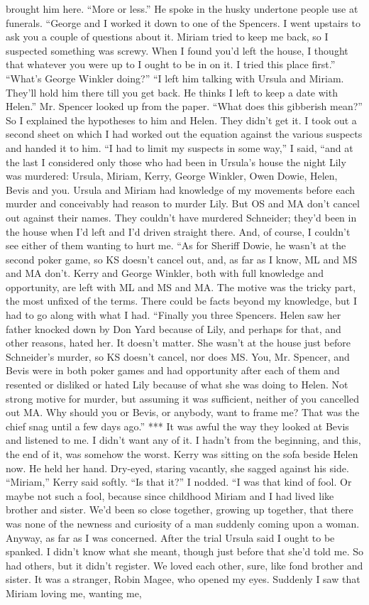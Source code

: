 \documentclass{novel}
\begin{document}
brought him here. “More or less.” He spoke in the husky undertone people use at funerals. “George and I worked it down to one of the Spencers. I went upstairs to ask you a couple of questions about it. Miriam tried to keep me back, so I suspected something was screwy. When I found you’d left the house, I thought that whatever you were up to I ought to be in on it. I tried this place first.” “What’s George Winkler doing?” “I left him talking with Ursula and Miriam. They’ll hold him there till you get back. He thinks I left to keep a date with Helen.” Mr. Spencer looked up from the paper. “What does this gibberish mean?” So I explained the hypotheses to him and Helen. They didn’t get it. I took out a second sheet on which I had worked out the equation against the various suspects and handed it to him. “I had to limit my suspects in some way,” I said, “and at the last I considered only those who had been in Ursula’s house the night Lily was murdered: Ursula, Miriam, Kerry, George Winkler, Owen Dowie, Helen, Bevis and you. Ursula and Miriam had knowledge of my movements before each murder and conceivably had reason to murder Lily. But OS and MA don’t cancel out against their names. They couldn’t have murdered Schneider; they’d been in the house when I’d left and I’d driven straight there. And, of course, I couldn’t see either of them wanting to hurt me. “As for Sheriff Dowie, he wasn’t at the second poker game, so KS doesn’t cancel out, and, as far as I know, ML and MS and MA don’t. Kerry and George Winkler, both with full knowledge and opportunity, are left with ML and MS and MA. The motive was the tricky part, the most unfixed of the terms. There could be facts beyond my knowledge, but I had to go along with what I had. “Finally you three Spencers. Helen saw her father knocked down by Don Yard because of Lily, and perhaps for that, and other reasons, hated her. It doesn’t matter. She wasn’t at the house just before Schneider’s murder, so KS doesn’t cancel, nor does MS. You, Mr. Spencer, and Bevis were in both poker games and had opportunity after each of them and resented or disliked or hated Lily because of what she was doing to Helen. Not strong motive for murder, but assuming it was sufficient, neither of you cancelled out MA. Why should you or Bevis, or anybody, want to frame me? That was the chief snag until a few days ago.” *** It was awful the way they looked at Bevis and listened to me. I didn’t want any of it. I hadn’t from the beginning, and this, the end of it, was somehow the worst. Kerry was sitting on the sofa beside Helen now. He held her hand. Dry-eyed, staring vacantly, she sagged against his side. “Miriam,” Kerry said softly. “Is that it?” I nodded. “I was that kind of fool. Or maybe not such a fool, because since childhood Miriam and I had lived like brother and sister. We’d been so close together, growing up together, that there was none of the newness and curiosity of a man suddenly coming upon a woman. Anyway, as far as I was concerned. After the trial Ursula said I ought to be spanked. I didn’t know what she meant, though just before that she’d told me. So had others, but it didn’t register. We loved each other, sure, like fond brother and sister. It was a stranger, Robin Magee, who opened my eyes. Suddenly I saw that Miriam loving me, wanting me, 
\end{document}

